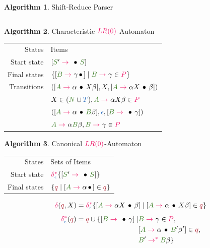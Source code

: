 \documentclass[10pt, landscape]{article}
\theoremstyle{definition}
\newtheorem{algorithm}{Algorithm}[section]
\newcommand{\Op}[1]{\textcolor{WildStrawberry}{#1}}
\newcommand{\Bul}{\,\bullet\,}
\newcommand{\derive}[1][]{\Op{\;\rightarrow_{#1}\;}}
\newcommand{\derives}[1][]{\Op{\;\rightarrow_{#1}^{*}\;}}
\newcommand{\nontermcolor}{OliveGreen}
\newcommand{\nt}[1]{\textcolor{\nontermcolor}{#1}}
\newcommand{\nonterms}{\nt{N}}
\newcommand{\ntA}{\nt{A}}
\newcommand{\ntB}{\nt{B}}
\newcommand{\ntS}{\nt{S}}
\newcommand{\termcolor}{NavyBlue}
\newcommand{\terms}{\textcolor{\termcolor}{T}}
\newcommand{\termEps}{\textcolor{\termcolor}{\epsilon}}
\newcommand{\prodcolor}{WildStrawberry}
\newcommand{\prods}{\textcolor{\prodcolor}{P}}
\newcommand{\LRZero}{\textcolor{\prodcolor}{LR (0)}}
\newcommand{\trans}{%
  { \textcolor{WildStrawberry}{\delta} }
}
\newcommand{\closedtrans}{%
  \textcolor{WildStrawberry}{\delta}_{ \textcolor{NavyBlue}{\epsilon} }^{ \textcolor{WildStrawberry}{*} }
}
\newcommand{\statecolor}{Maroon}
\newcommand{\stateQ}[1][]{\textcolor{\statecolor}{q_{#1}}}
\begin{document}
\begin{multicols*}{3}
\begin{algorithm}{Shift-Reduce Parser}
\begin{tabular}{r l l}
  \end{tabular}

\end{algorithm}

\begin{algorithm}{Characteristic $\LRZero$-Automaton}

  \begin{tabular}{r l}

    States       & Items \\
    Start state  & $[\ntS' \derive \Bul \ntS]$ \\
    Final states & $\{ [\ntB \derive \gamma \Bul] \mid \ntB \derive \gamma \in \prods \}$ \\
    Transitions  & $([\ntA \derive \alpha \Bul X \beta], X, [\ntA \derive \alpha X \Bul \beta])$ \\
                 & \indent $X \in (\nonterms \cup \terms), \ntA \derive \alpha X \beta \in \prods$ \\
                 & $([\ntA \derive \alpha \Bul \ntB \beta], \termEps, [\ntB \derive \Bul \gamma])$ \\
                 & \indent $\ntA \derive \alpha \ntB \beta, \ntB \derive \gamma \in \prods$\\

  \end{tabular}

\end{algorithm}

\begin{algorithm}{Canonical $\LRZero$-Automaton}

  \begin{tabular}{r l}

    States       & Sets of Items \\
    Start state  & $\closedtrans \{ [\ntS' \derive \Bul \ntS] \}$ \\
    Final states & $\{ \stateQ \mid [\ntA \derive \alpha \Bul] \in \stateQ \}$ \\
  \end{tabular}

  \[
    \trans (\stateQ, X) = \closedtrans \{ [\ntA \derive \alpha X \Bul \beta] \mid [\ntA \derive \alpha \Bul X \beta ] \in \stateQ \}
  \]
  \[
    \begin{aligned}
      \closedtrans (\stateQ) = \stateQ \cup \{ [\ntB \derive \Bul \gamma] \mid & \ntB \derive \gamma \in \prods, \\
                                                                                  & [\ntA \derive \alpha \Bul \ntB' \beta'] \in \stateQ, \\
                                                                                  & \ntB' \derives \ntB\beta\}
    \end{aligned}
  \]


\end{algorithm}
\end{multicols*}
\end{document}
